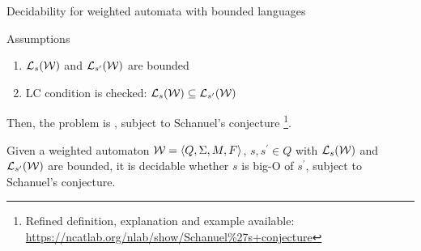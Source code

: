 \documentclass[aspectratio=169]{beamer}
\begin{document}
\begin{frame}{Decidability for weighted automata with bounded languages}
    \begin{block}{Assumptions}
        \begin{enumerate}
            \item ${\cal L}_s{(\cal W)}$ and ${\cal L}_{s^\prime}{(\cal W)}$ are bounded
            \item LC condition is checked: ${\cal L}_s{(\cal W)} \subseteq {\cal L}_{s^\prime}{(\cal W)}$
        \end{enumerate}
    \end{block}
    Then, the problem is , subject to Schanuel’s conjecture \footnote{Refined definition, explanation and example available: \url{https://ncatlab.org/nlab/show/Schanuel\%27s+conjecture}}.

    \begin{theorem}
        Given a weighted automaton ${\cal W} = \langle Q, \Sigma,M,F\rangle$, $s,s^\prime \in Q$ with ${\cal L}_s{(\cal W)}$ and ${\cal L}_{s^\prime}{(\cal W)}$ are bounded, it is decidable whether $s$ is big-O of $s^\prime$, subject to Schanuel's conjecture.
    \end{theorem}



\end{frame}
\end{document}
